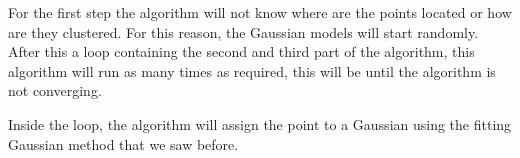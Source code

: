 \documentclass[conference]{IEEEtran}
\begin{document}
For the first step the algorithm will not know where are the points located or how are they clustered. For this reason, the Gaussian models will start randomly. After this a loop containing the second and third part of the algorithm, this algorithm will run as many times as required, this will be until the algorithm is not converging.

Inside the loop, the algorithm will assign the point to a Gaussian using the fitting Gaussian method that we saw before. 


%
%
\end{document}

